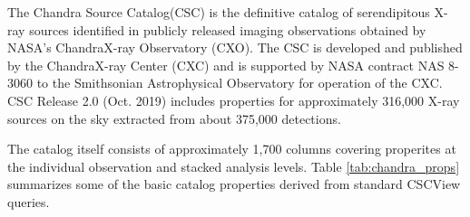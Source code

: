 The Chandra Source Catalog(CSC) is the definitive catalog of serendipitous X-ray sources identified in
publicly released imaging observations obtained by NASA’s ChandraX-ray Observatory (CXO).  The CSC is
developed and published by the ChandraX-ray Center (CXC) and is supported by NASA contract NAS 8-3060
to the Smithsonian Astrophysical Observatory for operation of the CXC.  CSC Release 2.0 (Oct. 2019) includes
properties for approximately 316,000 X-ray sources on the sky extracted from about 375,000 detections.

The catalog itself consists of approximately 1,700 columns covering properites at the individual observation and stacked analysis levels.
Table \ref{tab:chandra_props} summarizes some of the basic catalog properties derived from standard CSCView queries.

